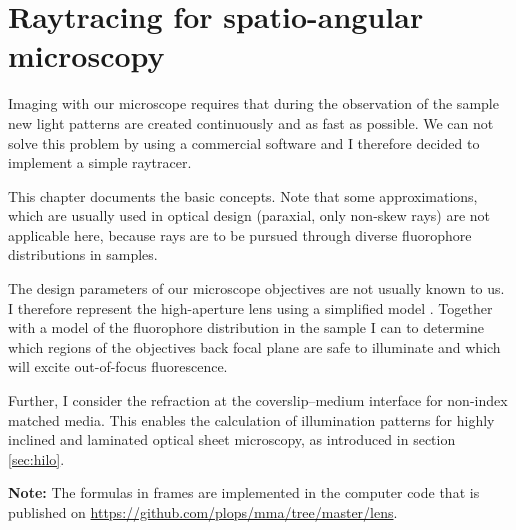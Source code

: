 \chapter{Raytracing for spatio-angular microscopy}
\label{sec:raytrace}
\renewcommand{\i}{\nvect i}
\begin{summary}
  Imaging with our microscope requires that during the observation of
  the sample new light patterns are created continuously and as fast
  as possible. We can not solve this problem by using a commercial
  software and I therefore decided to implement a simple raytracer.

  This chapter documents the basic concepts. Note that some
  approximations, which are usually used in optical design (paraxial,
  only non-skew rays) are not applicable here, because rays are to be
  pursued through diverse fluorophore distributions in samples.

  The design parameters of our microscope objectives are not usually
  known to us. I therefore represent the high-aperture lens using a
  simplified model \citep{Hwang2008}. Together with a model of the
  fluorophore distribution in the sample I can to determine which
  regions of the objectives back focal plane are safe to illuminate
  and which will excite out-of-focus fluorescence.

  Further, I consider the refraction at the coverslip--medium
  interface for non-index matched media. This enables the calculation
  of illumination patterns for highly inclined and laminated optical
  sheet microscopy, as introduced in section \ref{sec:hilo}.

  {\bf Note:} The formulas in frames are implemented in the computer
  code that is published on
  \url{https://github.com/plops/mma/tree/master/lens}.
\end{summary}
